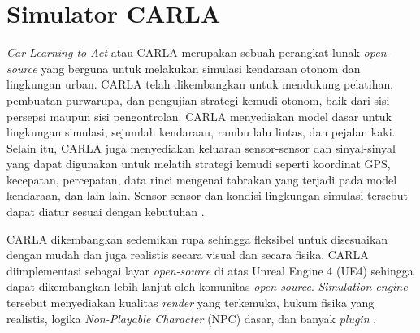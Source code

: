 

\section{Simulator CARLA}
\textit{Car Learning to Act} atau CARLA merupakan sebuah perangkat lunak
\textit{open-source} yang berguna untuk melakukan simulasi kendaraan otonom dan
lingkungan urban. CARLA telah dikembangkan untuk mendukung pelatihan, pembuatan
purwarupa, dan pengujian strategi kemudi otonom, baik dari sisi persepsi maupun
sisi pengontrolan. CARLA menyediakan model dasar untuk lingkungan simulasi,
sejumlah kendaraan, rambu lalu lintas, dan pejalan kaki. Selain itu, CARLA juga
menyediakan keluaran sensor-sensor dan sinyal-sinyal yang dapat digunakan untuk
melatih strategi kemudi seperti koordinat GPS, kecepatan, percepatan, data rinci
mengenai tabrakan yang terjadi pada model kendaraan, dan lain-lain.
Sensor-sensor dan kondisi lingkungan simulasi tersebut dapat diatur sesuai
dengan kebutuhan \parencite{carla-dosovitskiy}.

CARLA dikembangkan sedemikan rupa sehingga fleksibel untuk disesuaikan dengan
mudah dan juga realistis secara visual dan secara fisika. CARLA diimplementasi
sebagai layar \textit{open-source} di atas Unreal Engine 4 (UE4) sehingga dapat
dikembangkan lebih lanjut oleh komunitas \textit{open-source}.
\textit{Simulation engine} tersebut menyediakan kualitas \textit{render} yang
terkemuka, hukum fisika yang realistis, logika \textit{Non-Playable Character}
(NPC) dasar, dan banyak \textit{plugin} \parencite{carla-dosovitskiy}.

